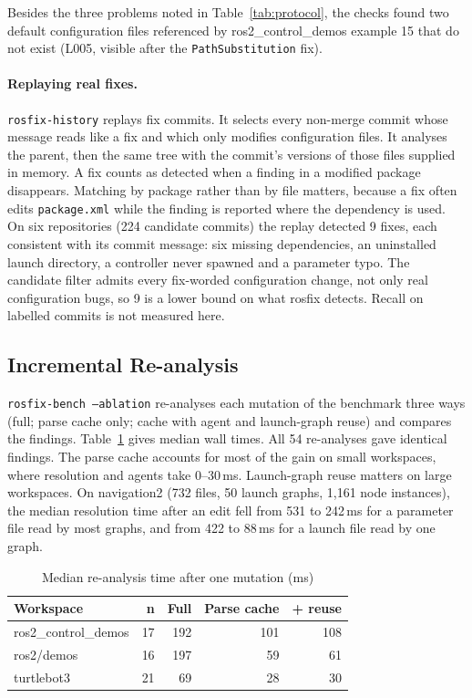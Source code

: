 \documentclass[conference]{IEEEtran}
\newcommand{\code}[1]{\texttt{#1}}
\begin{document}
Besides the three problems noted in Table~\ref{tab:protocol}, the checks found two default
configuration files referenced by ros2\_control\_demos example 15 that do not exist (L005,
visible after the \code{PathSubstitution} fix).

\paragraph{Replaying real fixes.} \code{rosfix-history} replays fix commits. It selects every
non-merge commit whose message reads like a fix and which only modifies configuration files. It
analyses the parent, then the same tree with the commit's versions of those files supplied in
memory. A fix counts as detected when a finding in a modified package disappears. Matching by
package rather than by file matters, because a fix often edits \code{package.xml} while the
finding is reported where the dependency is used. On six repositories (224 candidate commits) the
replay detected 9 fixes, each consistent with its commit message: six missing dependencies, an
uninstalled launch directory, a controller never spawned and a parameter typo. The candidate
filter admits every fix-worded configuration change, not only real configuration bugs, so 9 is a
lower bound on what rosfix detects. Recall on labelled commits is not measured here.

\subsection{Incremental Re-analysis}
\label{sec:incremental-eval}

\code{rosfix-bench --ablation} re-analyses each mutation of the benchmark three ways (full; parse
cache only; cache with agent and launch-graph reuse) and compares the findings.
Table~\ref{tab:ablation} gives median wall times. All 54 re-analyses gave identical findings. The
parse cache accounts for most of the gain on small workspaces, where resolution and agents take
0--30\,ms. Launch-graph reuse matters on large workspaces. On navigation2 (732 files, 50 launch
graphs, 1,161 node instances), the median resolution time after an edit fell from 531 to
242\,ms for a parameter file read by most graphs, and from 422 to 88\,ms for a launch file read
by one graph.

\begin{table}[t]
\centering
\caption{Median re-analysis time after one mutation (ms)}
\label{tab:ablation}
\footnotesize
\begin{tabular}{@{}l r r r r@{}}
\toprule
Workspace & n & Full & Parse cache & + reuse \\
\midrule
ros2\_control\_demos & 17 & 192 & 101 & 108 \\
ros2/demos & 16 & 197 & 59 & 61 \\
turtlebot3 & 21 & 69 & 28 & 30 \\
\bottomrule
\end{tabular}
\end{table}
\end{document}
